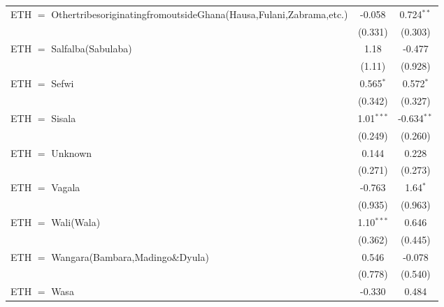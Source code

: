 \begin{table}[htbp!]
\begin{adjustbox}{width = 1\textwidth, max height = 0.95\textheight, center}
\begin{threeparttable}[b]
\begin{tabular}{lcc}
            ETH $=$ OthertribesoriginatingfromoutsideGhana(Hausa,Fulani,Zabrama,etc.) & -0.058        & 0.724$^{**}$\\   
                                                                                      & (0.331)       & (0.303)\\   
            ETH $=$ Salfalba(Sabulaba)                                                & 1.18          & -0.477\\   
                                                                                      & (1.11)        & (0.928)\\   
            ETH $=$ Sefwi                                                             & 0.565$^{*}$   & 0.572$^{*}$\\   
                                                                                      & (0.342)       & (0.327)\\   
            ETH $=$ Sisala                                                            & 1.01$^{***}$  & -0.634$^{**}$\\   
                                                                                      & (0.249)       & (0.260)\\   
            ETH $=$ Unknown                                                           & 0.144         & 0.228\\   
                                                                                      & (0.271)       & (0.273)\\   
            ETH $=$ Vagala                                                            & -0.763        & 1.64$^{*}$\\   
                                                                                      & (0.935)       & (0.963)\\   
            ETH $=$ Wali(Wala)                                                        & 1.10$^{***}$  & 0.646\\   
                                                                                      & (0.362)       & (0.445)\\   
            ETH $=$ Wangara(Bambara,Madingo\&Dyula) & 0.546 & -0.078\\ 
                                                                                      & (0.778)       & (0.540)\\   
            ETH $=$ Wasa                                                              & -0.330        & 0.484\\   

\end{tabular}
\end{threeparttable}
\end{adjustbox}
\end{table}
